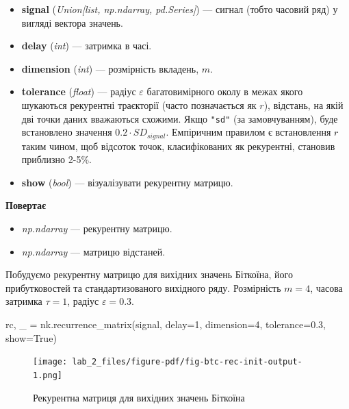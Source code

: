 \documentclass[
  letterpaper,
]{report}
\newenvironment{Shaded}{\begin{snugshade}}{\end{snugshade}}
\newcommand{\DecValTok}[1]{\textcolor[rgb]{0.68,0.00,0.00}{#1}}
\newcommand{\FloatTok}[1]{\textcolor[rgb]{0.68,0.00,0.00}{#1}}
\newcommand{\NormalTok}[1]{\textcolor[rgb]{0.00,0.23,0.31}{#1}}
\newcommand{\OperatorTok}[1]{\textcolor[rgb]{0.37,0.37,0.37}{#1}}
\newcommand{\VariableTok}[1]{\textcolor[rgb]{0.07,0.07,0.07}{#1}}
\providecommand{\tightlist}{%
  \setlength{\itemsep}{0pt}\setlength{\parskip}{0pt}}\usepackage{longtable,booktabs,array}
\begin{document}
\begin{itemize}
\tightlist
\item
  \textbf{signal} (\emph{Union{[}list, np.ndarray, pd.Series{]}}) ---
  сигнал (тобто часовий ряд) у вигляді вектора значень.
\item
  \textbf{delay} (\emph{int}) --- затримка в часі.
\item
  \textbf{dimension} (\emph{int}) --- розмірність вкладень, \(m\).
\item
  \textbf{tolerance} (\emph{float}) --- радіус \(\varepsilon\)
  багатовимірного околу в межах якого шукаються рекурентні траєкторії
  (часто позначається як \(r\)), відстань, на якій дві точки даних
  вважаються схожими. Якщо \texttt{"sd"} (за замовчуванням), буде
  встановлено значення \(0.2 \cdot SD_{signal}\). Емпіричним правилом є
  встановлення \(r\) таким чином, щоб відсоток точок, класифікованих як
  рекурентні, становив приблизно 2-5\%.
\item
  \textbf{show} (\emph{bool}) --- візуалізувати рекурентну матрицю.
\end{itemize}

\textbf{Повертає}

\begin{itemize}
\tightlist
\item
  \emph{np.ndarray} --- рекурентну матрицю.
\item
  \emph{np.ndarray} --- матрицю відстаней.
\end{itemize}

Побудуємо рекурентну матрицю для вихідних значень Біткоїна, його
прибутковостей та стандартизованого вихідного ряду. Розмірність \(m=4\),
часова затримка \(\tau=1\), радіус \(\varepsilon=0.3\).

\begin{Shaded}
\begin{Highlighting}[]
\NormalTok{rc, \_ }\OperatorTok{=}\NormalTok{ nk.recurrence\_matrix(signal, }
\NormalTok{                            delay}\OperatorTok{=}\DecValTok{1}\NormalTok{, }
\NormalTok{                            dimension}\OperatorTok{=}\DecValTok{4}\NormalTok{, }
\NormalTok{                            tolerance}\OperatorTok{=}\FloatTok{0.3}\NormalTok{,}
\NormalTok{                            show}\OperatorTok{=}\VariableTok{True}\NormalTok{)}
\end{Highlighting}
\end{Shaded}

\begin{figure}[H]

{\centering \texttt{[image: lab\_2\_files/figure-pdf/fig-btc-rec-init-output-1.png]}

}

\caption{\label{fig-btc-rec-init}Рекурентна матриця для вихідних значень
Біткоїна}

\end{figure}
\end{document}
